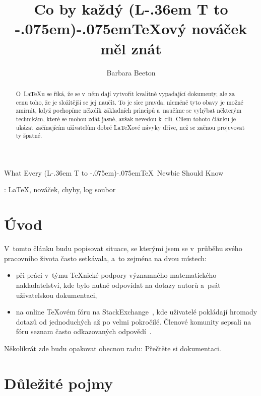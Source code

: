 \documentclass{csbulletin}
\makeatletter
\DeclareRobustCommand{\La}{L\kern-.36em%
        {\sbox\z@ T%
         \vbox to\ht\z@{\hbox{\check@mathfonts
                              \fontsize\sf@size\z@
                              \math@fontsfalse\selectfont
                              A}%
                        \vss}%
        }}
\def\AllTeX{(\La\kern-.075em)\kern-.075em\TeX}
\makeatother
\begin{document}
\title
  {Co by každý \AllTeX ový nováček měl znát}
\EnglishTitle
  {What Every \AllTeX\ Newbie Should Know}
\author{Barbara Beeton}

\maketitle[3pt]

\begin{abstract}
O~\LaTeX u se říká, že se v~něm dají vytvořit kvalitně vypadající dokumenty,
ale za cenu toho, že je složitější se jej naučit.
To je sice pravda, nicméně tyto obavy je možné zmírnit, když pochopíme několik základních principů a~naučíme se vyhýbat některým technikám, které se mohou zdát jasné, avšak nevedou k~cíli. Cílem tohoto článku je ukázat začínajícím uživatelům dobré \LaTeX ové návyky dříve, než se začnou projevovat ty špatné.
\end{abstract}
\klicovaslova: \LaTeX, nováček, chyby, log soubor

\makeatletter
\def\@thefnmark{}
\makeatother

\section{Úvod}

V~tomto článku budu popisovat situace, se kterými jsem se v~průběhu svého pracovního života často setkávala, a~to zejména na dvou místech:
\begin{itemize}
\item při práci v~týmu \TeX nické podpory významného matematického nakladatelství, kde bylo nutné odpovídat na dotazy autorů a~psát uživatelskou dokumentaci,
\item na online \TeX ovém fóru na StackExchange~\cite{TSE}, kde uživatelé pokládají hromady dotazů od jednoduchých až po velmi pokročilé. Členové komunity sepsali na fóru seznam často odkazovaných odpovědí~\cite{2419}.
\end{itemize}
Několikrát zde budu opakovat obecnou radu: Přečtěte si dokumentaci.

\section{Důležité pojmy}
\label{dupo}
\end{document}

